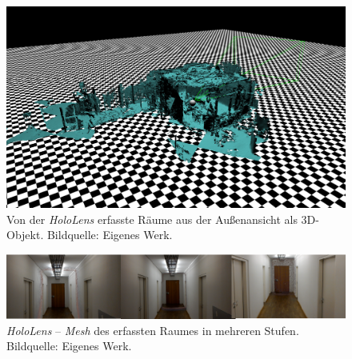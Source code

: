 \begin{figure}[ht]
	\centering
	\includegraphics[width=.75\textwidth]{figuren/HoloLens_office2}
	\caption{Von der \textit{HoloLens} erfasste Räume aus der Außenansicht als 3D-Objekt. Bildquelle: Eigenes Werk.}
	\label{fig:holoLens_office_obj2}
\end{figure}
\begin{figure}[ht]
	\centering
	\includegraphics[width=1.0\textwidth]{figuren/HoloLens_mapping}
	\caption{\textit{HoloLens} -- \textit{Mesh} des erfassten Raumes in mehreren Stufen. Bildquelle: Eigenes Werk.}
	\label{fig:holoLens_mapping}
\end{figure}
